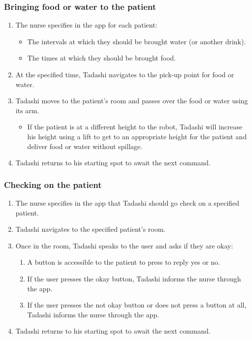 \documentclass{article}
\begin{document}
\subsubsection{Bringing food or water to the patient}
\begin{enumerate}
\item The nurse specifies in the app for each patient:
  \begin{itemize}
  \item The intervals at which they should be brought water (or another drink).
  \item The times at which they should be brought food.
  \end{itemize}
\item At the specified time, Tadashi navigates to the pick-up point for food or water.
\item Tadashi moves to the patient's room and passes over the food or water using its arm.
  \begin{itemize}
  \item If the patient is at a different height to the robot, Tadashi will increase his height using a lift to get to an appropriate height for the patient and deliver food or water without spillage. 
  \end{itemize}
\item Tadashi returns to his starting spot to await the next command.
\end{enumerate}


\subsubsection{Checking on the patient}
\begin{enumerate}
\item The nurse specifies in the app that Tadashi should go check on a specified patient. 
\item Tadashi navigates to the specified patient's room.
\item Once in the room, Tadashi speaks to the user and asks if they are okay:
  \begin{enumerate}
  \item A button is accessible to the patient to press to reply yes or no.
  \item If the user presses the okay button, Tadashi informs the nurse through the app. 
  \item If the user presses the not okay button or does not press a button at all, Tadashi informs the nurse through the app.
  \end{enumerate}
\item Tadashi returns to his starting spot to await the next command. 
\end{enumerate}
\end{document}
